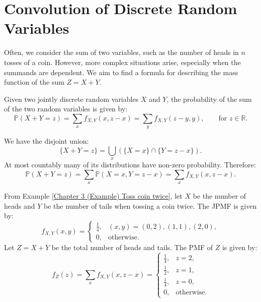 \documentclass{huhtakm-template-book-v2}
\newcommand{\prob}{\mathbb{P}}
\begin{document}
\section{Convolution of Discrete Random Variables}
    Often, we consider the sum of two variables, such as the number of heads in $n$ tosses of a coin. However, more complex situations arise, especially when the summands are dependent. We aim to find a formula for describing the mass function of the sum $Z = X+Y$.
    \begin{thm}
        Given two jointly discrete random variables $X$ and $Y$, the probability of the sum of the two random variables is given by:
        \begin{equation*}
            \prob(X+Y = z) = \sum_{x}f_{X,Y}(x,z-x) = \sum_{y}f_{X,Y}(z-y,y), \qquad\text{for }z \in \mathbb{R}.
        \end{equation*}
    \end{thm}
    \begin{proofing}
        We have the disjoint union:
        \begin{equation*}
            \{X+Y = z\} = \bigcup_{x}(\{X = x\}\cap\{Y = z-x\}).
        \end{equation*}
        At most countably many of its distributions have non-zero probability. Therefore:
        \begin{equation*}
            \prob(X+Y = z) = \sum_{x}\prob(X = x,Y = z-x) = \sum_{x}f_{X,Y}(x,z-x).
        \end{equation*}
    \end{proofing}
    \begin{eg}
        From Example \ref{Chapter 3 (Example) Toss coin twice}, let $X$ be the number of heads and $Y$ be the number of tails when tossing a coin twice. The JPMF is given by:
        \begin{equation*}
            f_{X,Y}(x, y) = \begin{cases}
                \frac{1}{4}, &(x, y) = (0,2),(1,1),(2,0),\\
                0, &\text{otherwise}.
            \end{cases}
        \end{equation*}
        Let $Z = X+Y$ be the total number of heads and tails. The PMF of $Z$ is given by:
        \begin{equation*}
            f_{Z}(z) = \sum_{x}f_{X,Y}(x,z-x) = \begin{cases}
                \frac{1}{4}, &z = 2,\\
                \frac{1}{2}, &z = 1,\\
                \frac{1}{4}, &z = 0,\\
                0, &\text{otherwise}.
            \end{cases}
        \end{equation*}
    \end{eg}
\end{document}
